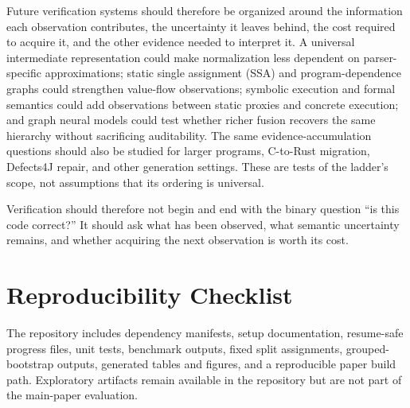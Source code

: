 ﻿\documentclass[conference]{IEEEtran}
\begin{document}
Future verification systems should therefore be organized around the information each observation contributes, the uncertainty it leaves behind, the cost required to acquire it, and the other evidence needed to interpret it. A universal intermediate representation could make normalization less dependent on parser-specific approximations; static single assignment (SSA) and program-dependence graphs could strengthen value-flow observations; symbolic execution and formal semantics could add observations between static proxies and concrete execution; and graph neural models could test whether richer fusion recovers the same hierarchy without sacrificing auditability. The same evidence-accumulation questions should also be studied for larger programs, C-to-Rust migration, Defects4J repair, and other generation settings. These are tests of the ladder's scope, not assumptions that its ordering is universal.

Verification should therefore not begin and end with the binary question ``is this code correct?'' It should ask what has been observed, what semantic uncertainty remains, and whether acquiring the next observation is worth its cost.




\appendices
\section{Reproducibility Checklist}
The repository includes dependency manifests, setup documentation, resume-safe progress files, unit tests, benchmark outputs, fixed split assignments, grouped-bootstrap outputs, generated tables and figures, and a reproducible paper build path. Exploratory artifacts remain available in the repository but are not part of the main-paper evaluation.
\end{document}
